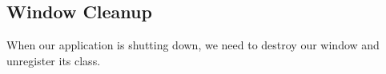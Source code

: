 \begin{minipage}{\linewidth}{\noindent}
    
\end{minipage}

\subsection{Window Cleanup}

When our application is shutting down, we need to destroy our window and unregister
its class.

\begin{minipage}{\linewidth}{\noindent}
    
\end{minipage}
